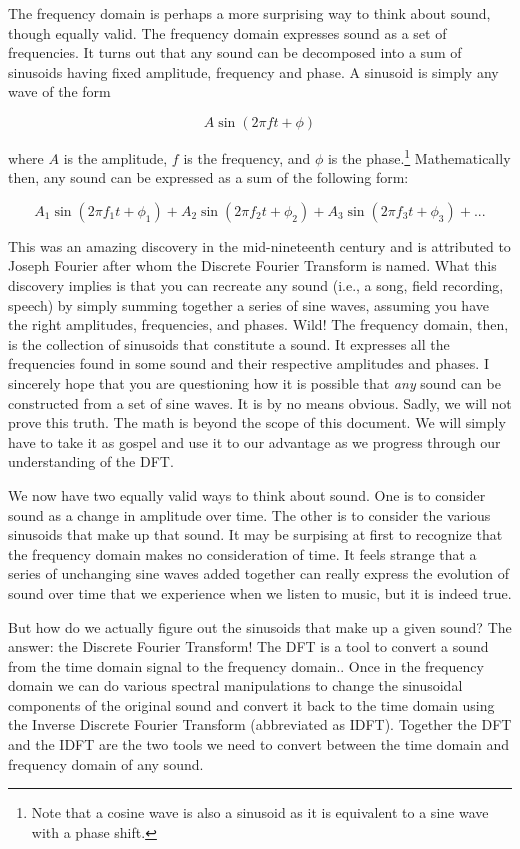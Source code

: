 The frequency domain is perhaps a more surprising way to think about sound, though equally valid.  The
frequency domain expresses sound as a set of frequencies.  It turns out that any sound can be decomposed 
into a sum of sinusoids having fixed amplitude, frequency and phase.  A sinusoid is simply any wave of the 
form 

$$ A\sin(2\pi f t + \phi) $$

\noindent where $A$ is the amplitude, $f$ is the frequency, and $\phi$ is the phase.\footnote{Note that a 
	cosine wave is also a 
sinusoid as it is equivalent to a sine wave with a phase shift.}  Mathematically then, any sound can be expressed
as a sum of the following form:

$$A_1\sin(2\pi f_1 t + \phi_1) + A_2\sin(2 \pi f_2 t + \phi_2) + A_3\sin(2 \pi f_3 t + \phi_3) + ...$$

This was an amazing discovery in the mid-nineteenth century and is attributed to Joseph Fourier after whom the
Discrete Fourier Transform is named.  What this discovery implies is that you can recreate any sound (i.e., a song, 
field recording, speech) by simply summing together a series of sine waves, assuming you have the right 
amplitudes, frequencies, and phases.  Wild!  The frequency domain, then, is the collection of sinusoids
that constitute a sound.  It expresses all the frequencies found in some sound and their respective amplitudes
and phases.  I sincerely hope that you are questioning how it is possible that \textit{any} sound can be
constructed from a set of sine waves.  It is by no means obvious.  Sadly, we will not prove this truth.  
The math is beyond the scope of this document.  We will simply have to take it as gospel and use it to our 
advantage as we progress through our understanding of the DFT.

	We now have two  equally valid ways to think about sound.  One is to consider sound
as a change in amplitude over time.  The other is to consider the various sinusoids that make up that sound.  It
may be surpising at first to recognize that the frequency domain makes no consideration of time.  It
feels strange that a series of unchanging sine waves added together can really express the evolution of
sound over time that we experience when we listen to music, but it is indeed true.
	
	But how do we actually figure out the sinusoids that make up a given sound?  The answer: the Discrete Fourier
Transform!  The DFT is a tool to convert a sound from the time domain signal to the frequency domain..  
Once in the frequency domain we can do various spectral manipulations
to change the sinusoidal components of the original sound and convert it back to the time domain using the
Inverse Discrete Fourier Transform (abbreviated as IDFT).  Together the DFT and the IDFT are the two
tools we need to convert between the time domain and frequency domain of any sound.

